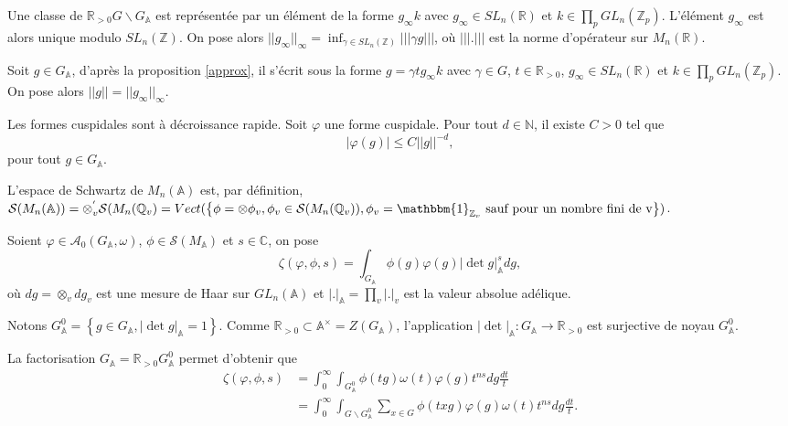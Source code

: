Une classe de $\mathbb{R}_{> 0}G\backslash G_\mathbb{A}$ est représentée par un élément de la forme $g_\infty k$ avec $g_\infty \in SL_n(\mathbb{R})$ et $k \in \prod_p GL_n(\mathbb{Z}_p)$. L'élément $g_\infty$ est alors unique modulo $SL_n(\mathbb{Z})$. On pose alors $||g_\infty||_\infty = \inf_{\gamma \in SL_n(\mathbb{Z})} |||\gamma g|||$, où $|||.|||$ est la norme d'opérateur sur $M_n(\mathbb{R})$.

Soit $g \in G_\mathbb{A}$, d'après la proposition \ref{approx}, il s'écrit sous la forme $g=\gamma t g_\infty k$ avec $\gamma \in G$, $t \in \mathbb{R}_{>0}$, $g_\infty \in SL_n(\mathbb{R})$ et $k \in \prod_p GL_n(\mathbb{Z}_p)$. On pose alors $||g|| = ||g_\infty||_\infty$.

\begin{proposition}
\label{decrap}
Les formes cuspidales sont à décroissance rapide. Soit $\varphi$ une forme cuspidale. Pour tout $d \in \mathbb{N}$, il existe $C > 0$ tel que
\begin{equation}
|\varphi(g)| \leq C||g||^{-d},
\end{equation}
pour tout $g \in G_{\mathbb{A}}$.
\end{proposition}

L'espace de Schwartz de $M_n(\mathbb{A})$ est, par définition, $\mathcal{S}(M_n(\mathbb{A}))=\otimes_v^{'} \mathcal{S}(M_n(\mathbb{Q}_v)=Vect(\left\lbrace \phi = \otimes \phi_v, \phi_v \in \mathcal{S}(M_n(\mathbb{Q}_v)), \phi_v = \mathbbm{1}_{\mathbb{Z}_v} \text{ sauf pour un nombre fini de v} \right\rbrace)$.

\begin{definition}
Soient $\varphi \in \mathcal{A}_0(G_\mathbb{A}, \omega)$, $\phi \in \mathcal{S}(M_\mathbb{A})$ et $s \in \mathbb{C}$, on pose
\begin{equation}
\zeta(\varphi, \phi, s) = \int_{G_\mathbb{A}} \phi(g) \varphi(g) |\det g|_\mathbb{A}^s dg,
\end{equation}
où $dg = \otimes_v dg_v$ est une mesure de Haar sur $GL_n(\mathbb{A})$ et $|.|_\mathbb{A} = \prod_v |.|_v$ est la valeur absolue adélique.
\end{definition}

Notons $G^0_\mathbb{A}=\left\lbrace g \in G_\mathbb{A}, |\det g|_\mathbb{A} = 1 \right\rbrace$. Comme $\mathbb{R}_{> 0} \subset \mathbb{A}^\times=Z(G_\mathbb{A})$, l'application $|\det|_\mathbb{A} : G_\mathbb{A} \rightarrow \mathbb{R}_{> 0}$ est surjective de noyau $G^0_\mathbb{A}$.

La factorisation $G_\mathbb{A} = \mathbb{R}_{> 0}G^0_\mathbb{A}$ permet d'obtenir que
\begin{align}
\zeta(\varphi, \phi, s) &= \int_0^\infty \int_{G^0_\mathbb{A}} \phi(tg) \omega(t) \varphi(g) t^{ns} dg \frac{dt}{t} \\
&= \int_0^\infty \int_{G \backslash G^0_\mathbb{A}} \sum_{x \in G}{\phi(txg)} \varphi(g) \omega(t) t^{ns} dg \frac{dt}{t}.
\end{align}


